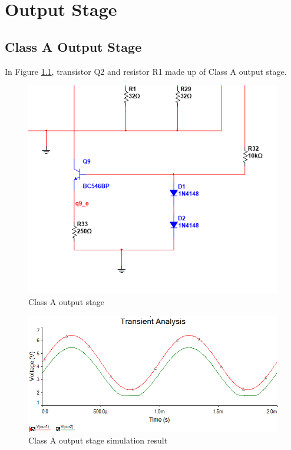 \chapter{Output Stage}

\section{Class A Output Stage}

In Figure \ref{fig:ClassAoutputstage}, transistor Q2 and resistor R1 made up of Class A output stage\cite{Amplifier}.

\begin{figure}[htbp]
\centering
\includegraphics[scale=1]{"../Photo/Chap4/Class A output stage"}
\caption{Class A output stage}
\label{fig:ClassAoutputstage}
\end{figure}


\begin{figure}[htbp]
\centering
\includegraphics[scale=0.8]{"../Photo/Chap4/Class A simulation result"}
\caption{Class A output stage simulation result}
\label{fig:ClassAsimulationresult}
\end{figure}

